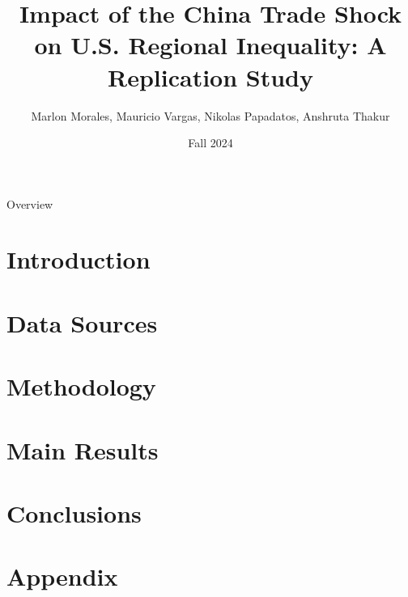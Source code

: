 \documentclass[8pt]{beamer}
\title{Impact of the China Trade Shock on U.S. Regional Inequality: A Replication Study}
\date{Fall 2024}
\author{
    Marlon Morales, Mauricio Vargas, Nikolas Papadatos, Anshruta Thakur
}
\begin{document}
\insertTitleSlide

\begin{frame}{Overview}
    \tableofcontents
\end{frame}


\section{Introduction}
    

\section{Data Sources}
    
\section{Methodology}
    

\section{Main Results}
    

\section{Conclusions}
    

\section{Appendix}
    
\insertLastSlide
\end{document}
